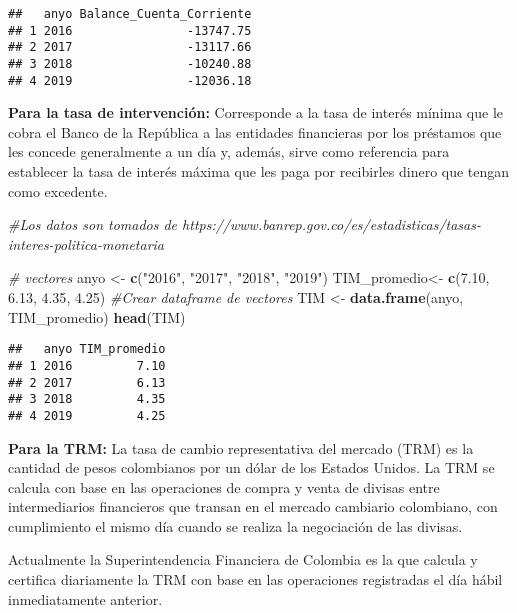 \documentclass[
  11pt,
]{article}
\newenvironment{Shaded}{\begin{snugshade}}{\end{snugshade}}
\newcommand{\CommentTok}[1]{\textcolor[rgb]{0.56,0.35,0.01}{\textit{#1}}}
\newcommand{\FloatTok}[1]{\textcolor[rgb]{0.00,0.00,0.81}{#1}}
\newcommand{\KeywordTok}[1]{\textcolor[rgb]{0.13,0.29,0.53}{\textbf{#1}}}
\newcommand{\NormalTok}[1]{#1}
\newcommand{\StringTok}[1]{\textcolor[rgb]{0.31,0.60,0.02}{#1}}
\begin{document}
\begin{verbatim}
##   anyo Balance_Cuenta_Corriente
## 1 2016                -13747.75
## 2 2017                -13117.66
## 3 2018                -10240.88
## 4 2019                -12036.18
\end{verbatim}

\textbf{Para la tasa de intervención:} Corresponde a la tasa de interés
mínima que le cobra el Banco de la República a las entidades financieras
por los préstamos que les concede generalmente a un día y, además, sirve
como referencia para establecer la tasa de interés máxima que les paga
por recibirles dinero que tengan como excedente.

\begin{Shaded}
\begin{Highlighting}[]
\CommentTok{#Los datos son tomados de https://www.banrep.gov.co/es/estadisticas/tasas-interes-politica-monetaria}

\CommentTok{# vectores }
\NormalTok{anyo <-}\StringTok{ }\KeywordTok{c}\NormalTok{(}\StringTok{"2016"}\NormalTok{, }\StringTok{"2017"}\NormalTok{, }\StringTok{"2018"}\NormalTok{, }\StringTok{"2019"}\NormalTok{)}
\NormalTok{TIM_promedio<-}\StringTok{ }\KeywordTok{c}\NormalTok{(}\FloatTok{7.10}\NormalTok{, }\FloatTok{6.13}\NormalTok{, }\FloatTok{4.35}\NormalTok{, }\FloatTok{4.25}\NormalTok{)}
\CommentTok{#Crear dataframe de vectores}
\NormalTok{TIM <-}\StringTok{ }\KeywordTok{data.frame}\NormalTok{(anyo, TIM_promedio)}
\KeywordTok{head}\NormalTok{(TIM)}
\end{Highlighting}
\end{Shaded}

\begin{verbatim}
##   anyo TIM_promedio
## 1 2016         7.10
## 2 2017         6.13
## 3 2018         4.35
## 4 2019         4.25
\end{verbatim}

\textbf{Para la TRM:} La tasa de cambio representativa del mercado (TRM)
es la cantidad de pesos colombianos por un dólar de los Estados Unidos.
La TRM se calcula con base en las operaciones de compra y venta de
divisas entre intermediarios financieros que transan en el mercado
cambiario colombiano, con cumplimiento el mismo día cuando se realiza la
negociación de las divisas.

Actualmente la Superintendencia Financiera de Colombia es la que calcula
y certifica diariamente la TRM con base en las operaciones registradas
el día hábil inmediatamente anterior.
\end{document}
